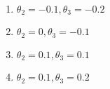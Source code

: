 \documentclass[journal]{IEEEtran}
\begin{document}
\begin{enumerate}
{\begin{figure}[H]
\label{fig:my_label}
\end{figure}
\begin{multicols}{2}
\begin{enumerate}
    \item $\theta_2=-0.1,\theta_3=-0.2$
    \item $\theta_2=0,\theta_3=-0.1$
    \item $\theta_2=0.1,\theta_3=0.1$
    \item $\theta_2=0.1,\theta_3=0.2$
\end{enumerate}
\end{multicols}
}
\end{enumerate}
\end{document}
